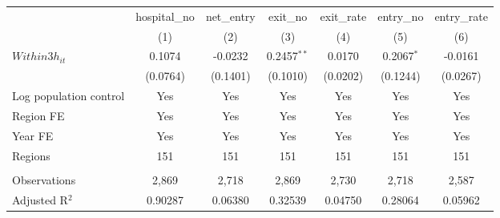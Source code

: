 \begingroup
\centering
\begin{tabular}{lcccccc}
   \toprule
                          & hospital\_no  & net\_entry  & exit\_no      & exit\_rate  & entry\_no    & entry\_rate \\    
                          & (1)           & (2)         & (3)           & (4)         & (5)          & (6)\\  
   \midrule 
   $Within3h_{it}$        & 0.1074        & -0.0232     & 0.2457$^{**}$ & 0.0170      & 0.2067$^{*}$ & -0.0161\\   
                          & (0.0764)      & (0.1401)    & (0.1010)      & (0.0202)    & (0.1244)     & (0.0267)\\   
   Log population control & Yes           & Yes         & Yes           & Yes         & Yes          & Yes\\  
   Region FE              & Yes           & Yes         & Yes           & Yes         & Yes          & Yes\\  
   Year FE                & Yes           & Yes         & Yes           & Yes         & Yes          & Yes\\  
   Regions                & 151           & 151         & 151           & 151         & 151          & 151\\  
    \\
   Observations           & 2,869         & 2,718       & 2,869         & 2,730       & 2,718        & 2,587\\  
   Adjusted R$^2$         & 0.90287       & 0.06380     & 0.32539       & 0.04750     & 0.28064      & 0.05962\\  
   \bottomrule
\end{tabular}
\par\endgroup

